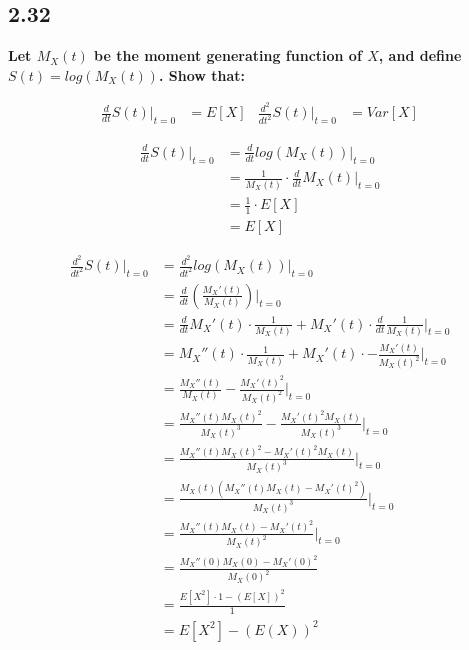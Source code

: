 \subsection*{2.32}

\textbf{Let $M_X(t)$ be the moment generating function of $X$, and define $S(t) = log(M_X(t))$. Show that:}

\begin{align*}
	\frac{d}{dt} S(t) \bigg\rvert_{t=0} &= E[X] & \frac{d^2}{dt^2} S(t) \bigg\rvert_{t=0} &= Var[X] 
\end{align*}

\begin{align*}
	\frac{d}{dt} S(t) \bigg\rvert_{t=0} &= \frac{d}{dt} log(M_X(t)) \bigg\rvert_{t=0}\\
	&= \frac{1}{M_X(t)} \cdot \frac{d}{dt} M_X(t) \bigg\rvert_{t=0} \\
	&= \frac{1}{1} \cdot E[X] \\
	&= E[X]
\end{align*}

\begin{align*}
	\frac{d^2}{dt^2} S(t) \bigg\rvert_{t=0} &= \frac{d^2}{dt^2} log(M_X(t))  \bigg\rvert_{t=0}\\
	&= \frac{d}{dt} \left( \frac{M_X'(t)}{M_X(t)} \right) \bigg\rvert_{t=0}  \\
	&= \frac{d}{dt} M_X'(t) \cdot \frac{1}{M_X(t)} + M_X'(t) \cdot \frac{d}{dt} \frac{1}{M_X(t)} \bigg\rvert_{t=0}\\
	&= M_X''(t) \cdot \frac{1}{M_X(t)} + M_X'(t) \cdot -\frac{M_X'(t)}{M_X(t)^2} \bigg\rvert_{t=0}\\
	&= \frac{M_X''(t)}{M_X(t)} - \frac{M_X'(t)^2}{M_X(t)^2} \bigg\rvert_{t=0}\\
	&= \frac{M_X''(t) M_X(t)^2}{M_X(t)^3} - \frac{M_X'(t)^2 M_X(t)}{M_X(t)^3}\bigg\rvert_{t=0} \\
	&= \frac{M_X''(t) M_X(t)^2 - M_X'(t)^2 M_X(t)}{M_X(t)^3} \bigg\rvert_{t=0} \\
	&= \frac{M_X(t)\left( M_X''(t) M_X(t) - M_X'(t)^2 \right)}{M_X(t)^3} \bigg\rvert_{t=0} \\ 
	&= \frac{M_X''(t) M_X(t) - M_X'(t)^2}{M_X(t)^2} \bigg\rvert_{t=0} \\
	&=  \frac{M_X''(0) M_X(0) - M_X'(0)^2}{M_X(0)^2} \\
	&= \frac{E[X^2] \cdot 1 - (E[X])^2}{1} \\
	&= E[X^2] - (E(X))^2
\end{align*}
